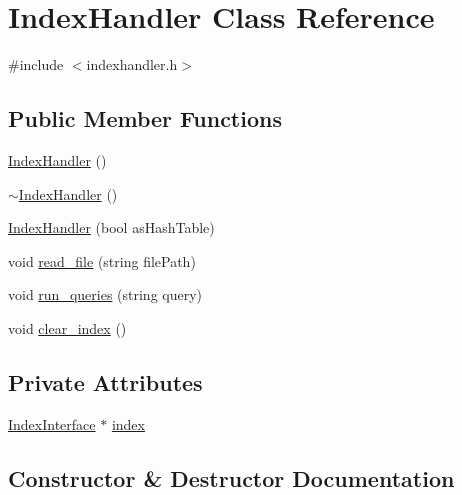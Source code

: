 \hypertarget{class_index_handler}{}\section{Index\+Handler Class Reference}
\label{class_index_handler}


{\ttfamily \#include $<$indexhandler.\+h$>$}

\subsection*{Public Member Functions}
\begin{DoxyCompactItemize}
\item 
\hyperlink{class_index_handler_a27748387661142a2eb545be6f0499996}{Index\+Handler} ()
\item 
\hyperlink{class_index_handler_ad787ca8cf83345ecfe332d2c3b8f8009}{$\sim$\+Index\+Handler} ()
\item 
\hyperlink{class_index_handler_ae50be3bec7e5ad3ede66110535043e15}{Index\+Handler} (bool as\+Hash\+Table)
\item 
void \hyperlink{class_index_handler_a3fe9b3c1b3df7eea7e4ae590df4a4339}{read\+\_\+file} (string file\+Path)
\item 
void \hyperlink{class_index_handler_acee974285412a635c3c31fe86b9e0fb8}{run\+\_\+queries} (string query)
\item 
void \hyperlink{class_index_handler_a417830272cfc725f6966c7a0a0ceae1d}{clear\+\_\+index} ()
\end{DoxyCompactItemize}
\subsection*{Private Attributes}
\begin{DoxyCompactItemize}
\item 
\hyperlink{class_index_interface}{Index\+Interface} $\ast$ \hyperlink{class_index_handler_aa30663ff8e3b52b43ce35ebb2d12752c}{index}
\end{DoxyCompactItemize}


\subsection{Constructor \& Destructor Documentation}
\hypertarget{class_index_handler_a27748387661142a2eb545be6f0499996}{}

